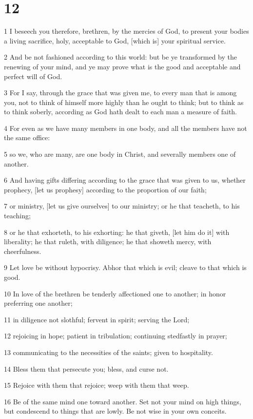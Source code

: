 \chapter{12}

\par 1 I beseech you therefore, brethren, by the mercies of God, to present your bodies a living sacrifice, holy, acceptable to God, [which is] your spiritual service.
\par 2 And be not fashioned according to this world: but be ye transformed by the renewing of your mind, and ye may prove what is the good and acceptable and perfect will of God.
\par 3 For I say, through the grace that was given me, to every man that is among you, not to think of himself more highly than he ought to think; but to think as to think soberly, according as God hath dealt to each man a measure of faith.
\par 4 For even as we have many members in one body, and all the members have not the same office:
\par 5 so we, who are many, are one body in Christ, and severally members one of another.
\par 6 And having gifts differing according to the grace that was given to us, whether prophecy, [let us prophesy] according to the proportion of our faith;
\par 7 or ministry, [let us give ourselves] to our ministry; or he that teacheth, to his teaching;
\par 8 or he that exhorteth, to his exhorting: he that giveth, [let him do it] with liberality; he that ruleth, with diligence; he that showeth mercy, with cheerfulness.
\par 9 Let love be without hypocrisy. Abhor that which is evil; cleave to that which is good.
\par 10 In love of the brethren be tenderly affectioned one to another; in honor preferring one another;
\par 11 in diligence not slothful; fervent in spirit; serving the Lord;
\par 12 rejoicing in hope; patient in tribulation; continuing stedfastly in prayer;
\par 13 communicating to the necessities of the saints; given to hospitality.
\par 14 Bless them that persecute you; bless, and curse not.
\par 15 Rejoice with them that rejoice; weep with them that weep.
\par 16 Be of the same mind one toward another. Set not your mind on high things, but condescend to things that are lowly. Be not wise in your own conceits.
